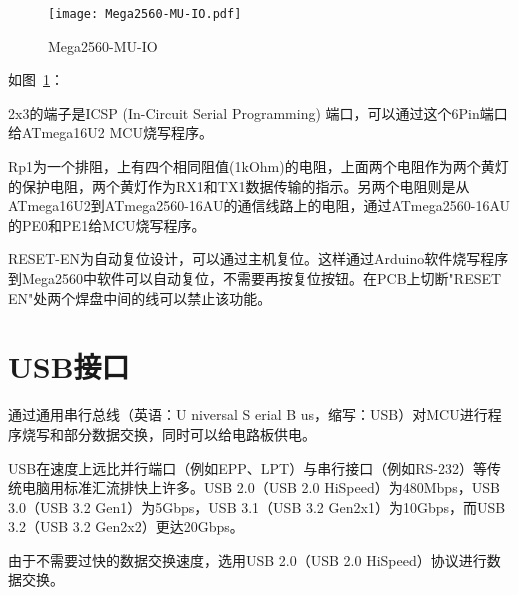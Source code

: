 \begin{figure}[htbp]
    \centering
    \texttt{[image: Mega2560-MU-IO.pdf]}
    \caption{Mega2560-MU-IO}
    \label{fig:Mega2560-MU-IO}
\end{figure}

如图~\ref{fig:Mega2560-MU-IO}：

2x3的端子是ICSP (In-Circuit Serial Programming) 端口，可以通过这个6Pin端口给ATmega16U2 MCU烧写程序。

Rp1为一个排阻，上有四个相同阻值(1kOhm)的电阻，上面两个电阻作为两个黄灯的保护电阻，两个黄灯作为RX1和TX1数据传输的指示。另两个电阻则是从ATmega16U2到ATmega2560-16AU的通信线路上的电阻，通过ATmega2560-16AU的PE0和PE1给MCU烧写程序。

RESET-EN为自动复位设计，可以通过主机复位。这样通过Arduino软件烧写程序到Mega2560中软件可以自动复位，不需要再按复位按钮。在PCB上切断"RESET EN"处两个焊盘中间的线可以禁止该功能。

\section{USB接口}

通过通用串行总线（英语：U niversal S erial B us，缩写：USB）对MCU进行程序烧写和部分数据交换，同时可以给电路板供电。

USB在速度上远比并行端口（例如EPP、LPT）与串行接口（例如RS-232）等传统电脑用标准汇流排快上许多。USB 2.0（USB 2.0 HiSpeed）为480Mbps，USB 3.0（USB 3.2 Gen1）为5Gbps，USB 3.1（USB 3.2 Gen2x1）为10Gbps，而USB 3.2（USB 3.2 Gen2x2）更达20Gbps。

由于不需要过快的数据交换速度，选用USB 2.0（USB 2.0 HiSpeed）协议进行数据交换。

